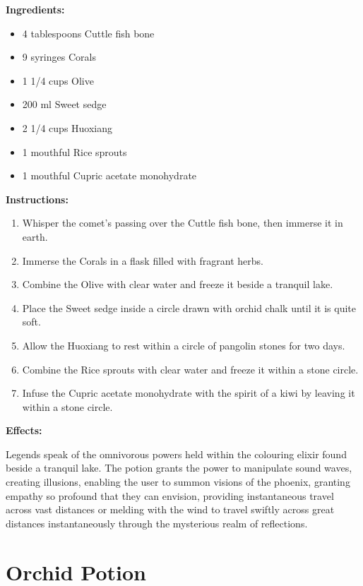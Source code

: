 \documentclass{article}
\begin{document}
\textbf{Ingredients:}

\begin{itemize}
  \item 4 tablespoons Cuttle fish bone
  \item 9 syringes Corals
  \item 1 1/4 cups Olive
  \item 200 ml Sweet sedge
  \item 2 1/4 cups Huoxiang
  \item 1 mouthful Rice sprouts
  \item 1 mouthful Cupric acetate monohydrate
\end{itemize}

\textbf{Instructions:}

\begin{enumerate}
  \item Whisper the comet’s passing over the Cuttle fish bone, then immerse it in earth.
  \item Immerse the Corals in a flask filled with fragrant herbs.
  \item Combine the Olive with clear water and freeze it beside a tranquil lake.
  \item Place the Sweet sedge inside a circle drawn with orchid chalk until it is quite soft.
  \item Allow the Huoxiang to rest within a circle of pangolin stones for two days.
  \item Combine the Rice sprouts with clear water and freeze it within a stone circle.
  \item Infuse the Cupric acetate monohydrate with the spirit of a kiwi by leaving it within a stone circle.
\end{enumerate}

\textbf{Effects:}

Legends speak of the omnivorous powers held within the colouring elixir found beside a tranquil lake. The potion grants the power to manipulate sound waves, creating illusions, enabling the user to summon visions of the phoenix, granting empathy so profound that they can envision, providing instantaneous travel across vast distances or melding with the wind to travel swiftly across great distances instantaneously through the mysterious realm of reflections.

\newpage
\section*{Orchid Potion}
\end{document}
